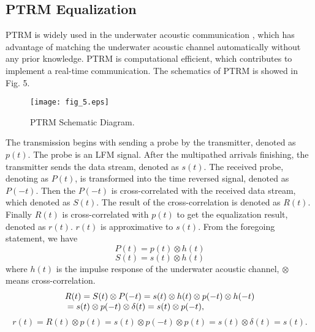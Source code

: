 \documentclass[journal]{IEEEtran}
\begin{document}
\subsection{PTRM Equalization}
PTRM is widely used in the underwater acoustic communication
\cite{Stojanovic2008,Shahabudeen2008,Stojanovic2009}, which has
advantage of matching the underwater acoustic channel automatically
without any prior knowledge. PTRM is computational efficient, which
contributes to implement a real-time communication. The schematics
of PTRM is showed in Fig. 5.
\begin{figure}[!t]
\centering
\texttt{[image: fig\_5.eps]}
\caption{PTRM Schematic Diagram.} \label{fig_sim}
\end{figure}

The transmission begins with sending a probe by the transmitter,
denoted as $p(t)$. The probe is an LFM signal. After the multipathed
arrivals finishing, the transmitter sends the data stream, denoted
as $s(t)$. The received probe, denoting as $P(t)$, is transformed
into the time reversed signal, denoted as $P(-t)$. Then the $P(-t)$
is cross-correlated with the received data stream, which denoted as
$S(t)$. The result of the cross-correlation is denoted as $R(t)$.
Finally $R(t)$ is cross-correlated with $p(t)$ to get the
equalization result, denoted as $r(t)$. $r(t)$ is approximative to
$s(t)$. From the foregoing statement, we have
\begin{equation}
\label{eqn_example} P(t) = p(t) \otimes h(t)
\end{equation}
\begin{equation}
\label{eqn_example} S(t) = s(t) \otimes h(t)
\end{equation}
where $h(t)$ is the impulse response of the underwater acoustic
channel, $\otimes$ means cross-correlation.
\begin{equation}
\label{eqn_example} \begin{array}{l}
 R(t) = S(t) \otimes P( - t) = s(t) \otimes h(t) \otimes p( - t) \otimes h( - t) \\
 {\rm{       }}= s(t) \otimes p( - t) \otimes \delta (t)  = s(t) \otimes p( - t), \\
 \end{array}
\end{equation}
\begin{equation}
\label{eqn_example} r(t) = R(t) \otimes p(t) = s(t) \otimes p( - t)
\otimes p(t) = s(t)\otimes \delta (t) = s(t).
\end{equation}
\end{document}
